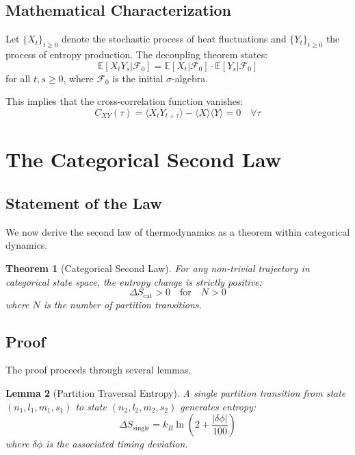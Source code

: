\documentclass[twocolumn,10pt]{article}
\newtheorem{theorem}{Theorem}[section]
\newtheorem{lemma}[theorem]{Lemma}
\begin{document}
\subsection{Mathematical Characterization}

Let $\{X_t\}_{t \geq 0}$ denote the stochastic process of heat fluctuations and $\{Y_t\}_{t \geq 0}$ the process of entropy production. The decoupling theorem states:
\begin{equation}
    \mathbb{E}[X_t Y_s | \mathcal{F}_0] = \mathbb{E}[X_t | \mathcal{F}_0] \cdot \mathbb{E}[Y_s | \mathcal{F}_0]
\end{equation}
for all $t, s \geq 0$, where $\mathcal{F}_0$ is the initial $\sigma$-algebra.

This implies that the cross-correlation function vanishes:
\begin{equation}
    C_{XY}(\tau) = \langle X_t Y_{t+\tau} \rangle - \langle X \rangle \langle Y \rangle = 0 \quad \forall \tau
\end{equation}

\section{The Categorical Second Law}
\label{sec:secondlaw}

\subsection{Statement of the Law}

We now derive the second law of thermodynamics as a theorem within categorical dynamics.

\begin{theorem}[Categorical Second Law]
\label{thm:secondlaw}
For any non-trivial trajectory in categorical state space, the entropy change is strictly positive:
\begin{equation}
    \Delta S_{\text{cat}} > 0 \quad \text{for} \quad N > 0
\end{equation}
where $N$ is the number of partition transitions.
\end{theorem}

\subsection{Proof}

The proof proceeds through several lemmas.

\begin{lemma}[Partition Traversal Entropy]
\label{lem:traversal}
A single partition transition from state $(n_1, l_1, m_1, s_1)$ to state $(n_2, l_2, m_2, s_2)$ generates entropy:
\begin{equation}
    \Delta S_{\text{single}} = k_B \ln\left(2 + \frac{|\delta\phi|}{100}\right)
\end{equation}
where $\delta\phi$ is the associated timing deviation.
\end{lemma}
\end{document}
